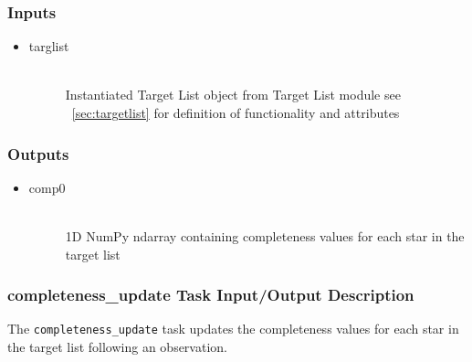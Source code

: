 \documentclass[cleanfoot]{asme2ej}
\begin{document}
\subsubsection*{Inputs}
\begin{itemize}
    \item 
    \begin{description}
        \item[targlist] \hfill \\
        Instantiated Target List object from Target List module see ~\ref{sec:targetlist} for definition of functionality and attributes
    \end{description}
\end{itemize}

\subsubsection*{Outputs}
\begin{itemize}
    \item 
    \begin{description}
        \item[comp0] \hfill \\
        1D NumPy ndarray containing completeness values for each star in the target list
    \end{description}
\end{itemize}

\subsubsection{completeness\_update Task Input/Output Description}
\label{sec:completenessupdatetask}
The \verb+completeness_update+ task updates the completeness values for each star in the target list following an observation.
\end{document}
